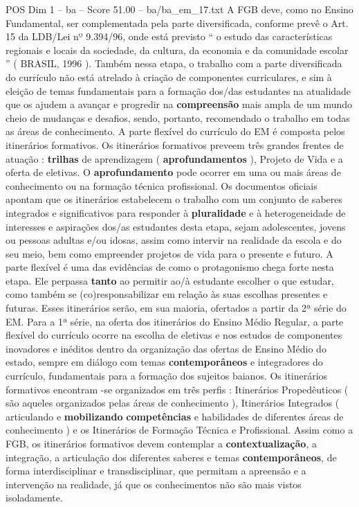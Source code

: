\begin{textsample}{POS Dim 1 – ba – Score 51.00 – ba/ba\_em\_17.txt}
A FGB deve, como no Ensino Fundamental, ser complementada pela parte diversificada, conforme prevê o Art. 15 da LDB/Lei nº 9.394/96, onde está previsto “ o estudo das características regionais e locais da sociedade, da cultura, da economia e da comunidade escolar ” ( BRASIL, 1996 ).
Também nessa etapa, o trabalho com a parte diversificada do currículo não está atrelado à criação de componentes curriculares, e sim à eleição de temas fundamentais para a formação dos/das estudantes na atualidade que os ajudem a avançar e progredir na \textbf{compreensão} mais ampla de um mundo cheio de mudanças e desafios, sendo, portanto, recomendado o trabalho em todas as áreas de conhecimento.
A parte flexível do currículo do EM é composta pelos itinerários formativos.
Os itinerários formativos preveem três grandes frentes de atuação : \textbf{trilhas} de aprendizagem ( \textbf{aprofundamentos} ), Projeto de Vida e a oferta de eletivas.
O \textbf{aprofundamento} pode ocorrer em uma ou mais áreas de conhecimento ou na formação técnica profissional.
Os documentos oficiais apontam que os itinerários estabelecem o trabalho com um conjunto de saberes integrados e significativos para responder à \textbf{pluralidade} e à heterogeneidade de interesses e aspirações dos/as estudantes desta etapa, sejam adolescentes, jovens ou pessoas adultas e/ou idosas, assim como intervir na realidade da escola e do seu meio, bem como empreender projetos de vida para o presente e futuro.
A parte flexível é uma das evidências de como o protagonismo chega forte nesta etapa.
Ele perpassa \textbf{tanto} ao permitir ao/à estudante escolher o que estudar, como também se (co)responsabilizar em relação às suas escolhas presentes e futuras.
Esses itinerários serão, em sua maioria, ofertados a partir da 2ª série do EM.
Para a 1ª série, na oferta dos itinerários do Ensino Médio Regular, a parte flexível do currículo ocorre na escolha de eletivas e nos estudos de componentes inovadores e inéditos dentro da organização das ofertas de Ensino Médio do estado, sempre em diálogo com temas \textbf{contemporâneos} e integradores do currículo, fundamentais para a formação dos sujeitos baianos.
Os itinerários formativos encontram -se organizados em três perfis : Itinerários Propedêuticos ( são aqueles organizados pelas áreas de conhecimento ), Itinerários Integrados ( articulando e \textbf{mobilizando} \textbf{competências} e habilidades de diferentes áreas de conhecimento ) e os Itinerários de Formação Técnica e Profissional.
Assim como a FGB, os itinerários formativos devem contemplar a \textbf{contextualização}, a integração, a articulação dos diferentes saberes e temas \textbf{contemporâneos}, de forma interdisciplinar e transdisciplinar, que permitam a apreensão e a intervenção na realidade, já que os conhecimentos não são mais vistos isoladamente.

\end{textsample}
